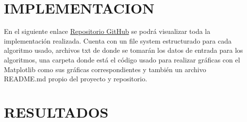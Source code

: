 \documentclass{article}
\begin{document}

\section{IMPLEMENTACION}
En el siguiente enlace \href{https://www.google.com}{Repositorio GitHub} se podrá visualizar toda la implementación realizada. Cuenta con un file system estructurado para cada algoritmo usado, archivos txt de donde se tomarán los datos de entrada para los algoritmos, una carpeta donde está el código usado para realizar gráficas con el Matplotlib como sus gráficas correspondientes y también un archivo README.md propio del proyecto y repositorio.

\section{RESULTADOS}
\end{document}
